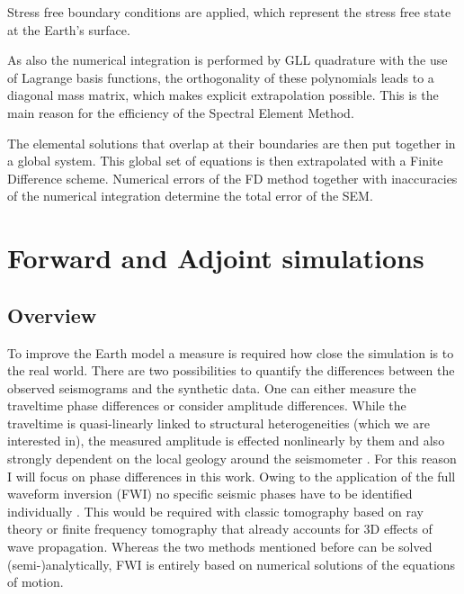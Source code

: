 Stress free boundary conditions are applied, which represent the stress free state at the Earth's surface. 

As also the numerical integration is performed by GLL quadrature with the use of Lagrange basis functions, the orthogonality of these polynomials 
leads to a diagonal mass matrix, which makes explicit extrapolation possible. This is the main reason for the efficiency of the Spectral Element Method.

The elemental solutions that overlap at their boundaries are then put together in a global system. 
This global set of equations is then extrapolated with a Finite Difference scheme.
Numerical errors of the FD method together with inaccuracies of the numerical integration determine the total error of the SEM.



\section{Forward and Adjoint simulations}


\subsection{Overview}
To improve the Earth model a measure is required how close the simulation is to the real world. 
There are two possibilities to quantify the differences between the observed seismograms and the synthetic data.
One can either measure the traveltime phase differences or consider amplitude differences.
While the traveltime is quasi-linearly linked to structural heterogeneities (which we are interested in),
the measured amplitude is effected nonlinearly by them and also strongly dependent on the local geology 
around the seismometer \citep{Fichtner2008}.
For this reason I will focus on phase differences in this work.
Owing to the application of the full waveform inversion (FWI) no specific seismic phases have to be identified 
individually \citep{Fichtner}. 
This would be required with classic tomography based on ray theory or finite frequency tomography that already 
accounts for 3D effects of wave propagation. %
Whereas the two methods mentioned before can be solved (semi-)analytically, FWI is entirely based on numerical
solutions of the equations of motion.

